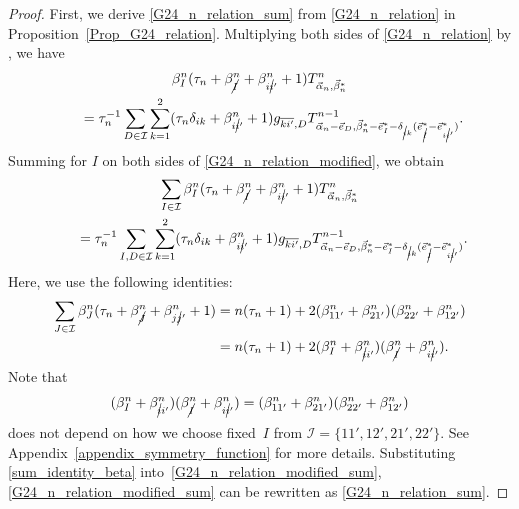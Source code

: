 \documentclass[10pt,a4paper]{amsart}
\numberwithin{equation}{section}
\begin{document}
\begin{proof}
First, we derive \eqref{G24_n_relation_sum} from \eqref{G24_n_relation} in Proposition~\ref{Prop_G24_relation}. Multiplying both sides of \eqref{G24_n_relation} by
,
we have
\begin{gather}
 \beta_{I}^{n}
 (
 \tau_{n}
 +
 \beta_{\cancel{I}}^{n}
 +
 \beta_{i\cancel{i}'}^{n}
 +
 1
 )
 T^{n}_{\vec{\alpha}_{n},\vec{\beta}_{n}^{\ast}}
 \nonumber\\
 \qquad=
 \tau_{n}^{-1}
 \sum_{
 D
 \in
 \mathcal{I}
 }
 \sum_{k=1}^{2}
 (
 \tau_{n}
 \delta_{ik}
 +
 \beta_{i\cancel{i}'}^{n}
 +
 1
 )
 g_{\overline{ki'},D}
 T^{n-1}_{
 \vec{\alpha}_{n}
 -
 \vec{e}_{D},
 \vec{\beta}_{n}^{\ast}
 -
 \vec{e}_{I}^{\ast}
 -
 \delta_{\cancel{i}k}
 (
 \vec{e}_{\cancel{I}}^{\ast}
 -
 \vec{e}_{i\cancel{i}'}^{\ast}
 )
 }
 .
 \label{G24_n_relation_modified}
\end{gather}
Summing for $I$ on both sides of \eqref{G24_n_relation_modified}, we obtain
\begin{gather}
 \sum_{
 I
 \in
 \mathcal{I}
 }
 \beta_{I}^{n}
 (
 \tau_{n}
 +
 \beta_{\cancel{I}}^{n}
 +
 \beta_{i\cancel{i}'}^{n}
 +
 1
 )
 T^{n}_{\vec{\alpha}_{n},\vec{\beta}_{n}^{\ast}}\nonumber\\
 \qquad=
 \tau_{n}^{-1}
 \sum_{
 I,
 D
 \in
 \mathcal{I}
 }
 \sum_{k=1}^{2}
 (
 \tau_{n}
 \delta_{ik}
 +
 \beta_{i\cancel{i}'}^{n}
 +
 1
 )
 g_{\overline{ki'},D}
 T^{n-1}_{
 \vec{\alpha}_{n}
 -
 \vec{e}_{D},
 \vec{\beta}_{n}^{\ast}
 -
 \vec{e}_{I}^{\ast}
 -
 \delta_{\cancel{i}k}
 (
 \vec{e}_{\cancel{I}}^{\ast}
 -
 \vec{e}_{i\cancel{i}'}^{\ast} ) } . \label{G24_n_relation_modified_sum}
\end{gather}
Here, we use the following identities:
\begin{align}
 \sum_{
 J
 \in
 \mathcal{I}
 }
 \beta_{J}^{n}
 (
 \tau_{n}
 +
 \beta_{\cancel{J}}^{n}
 +
 \beta_{j\cancel{j}'}^{n}
 +
 1
 )
& =
 n
 (
 \tau_{n}+1
 )
 +
 2
 (
 \beta_{11'}^{n}
 +
 \beta_{21'}^{n}
 )
 (
 \beta_{22'}^{n}
 +
 \beta_{12'}^{n}
 )
 \nonumber
 \\
 &=
 n
 (
 \tau_{n}+1
 )
 +
 2
 (
 \beta_{I}^{n}
 +
 \beta_{\cancel{i}i'}^{n}
 )
 (
 \beta_{\cancel{I}}^{n}
 +
 \beta_{i\cancel{i}'}^{n}
 ).
 \label{sum_identity_beta}
\end{align}
Note that
\[
 (
 \beta_{I}^{n}
 +
 \beta_{\cancel{i}i'}^{n}
 )
 (
 \beta_{\cancel{I}}^{n}
 +
 \beta_{i\cancel{i}'}^{n}
 )
 =
 (
 \beta_{11'}^{n}
 +
 \beta_{21'}^{n}
 )
 (
 \beta_{22'}^{n}
 +
 \beta_{12'}^{n}
 )
\]
does not depend on how we choose fixed~$I$
from
$
\mathcal{I}
=
\{
11',
12',
21',
22'
\}
$.
See Appendix~\ref{appendix_symmetry_function} for more details. Substituting \eqref{sum_identity_beta} into~\eqref{G24_n_relation_modified_sum}, \eqref{G24_n_relation_modified_sum} can be rewritten as \eqref{G24_n_relation_sum}.



\end{proof}
\end{document}
